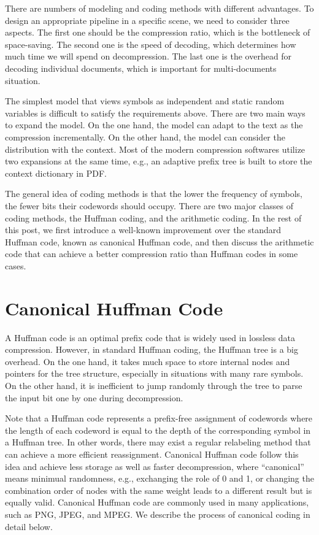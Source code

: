 \documentclass[a4paper,11pt]{article}
\begin{document}
There are numbers of modeling and coding methods with different advantages. To design an appropriate pipeline in a specific scene, we need to consider three aspects. The first one should be the compression ratio, which is the bottleneck of space-saving. The second one is the speed of decoding, which determines how much time we will spend on decompression. The last one is the overhead for decoding individual documents, which is important for multi-documents situation. 

The simplest model that views symbols as independent and static random variables is difficult to satisfy the requirements above. There are two main ways to expand the model. On the one hand, the model can adapt to the text as the compression incrementally. On the other hand, the model can consider the distribution with the context. Most of the modern compression softwares utilize two expansions at the same time, e.g., an adaptive prefix tree is built to store the context dictionary in PDF.

The general idea of coding methods is that the lower the frequency of symbols, the fewer bits their codewords should occupy. There are two major classes of coding methods, the Huffman coding, and the arithmetic coding. In the rest of this post, we first introduce a well-known improvement over the standard Huffman code, known as canonical Huffman code, and then discuss the arithmetic code that can achieve a better compression ratio than Huffman codes in some cases.


\section{Canonical Huffman Code}
A Huffman code is an optimal prefix code that is widely used in lossless data compression. However, in standard Huffman coding, the Huffman tree is a big overhead. On the one hand, it takes much space to store internal nodes and pointers for the tree structure, especially in situations with many rare symbols. On the other hand, it is inefficient to jump randomly through the tree to parse the input bit one by one during decompression. 

Note that a Huffman code represents a prefix-free assignment of codewords where the length of each codeword is equal to the depth of the corresponding symbol in a Huffman tree. In other words, there may exist a regular relabeling method that can achieve a more efficient reassignment. Canonical Huffman code follow this idea and achieve less storage as well as faster decompression, where ``canonical'' means minimual randomness, e.g., exchanging the role of 0 and 1, or changing the combination order of nodes with the same weight leads to a different result but is equally valid. Canonical Huffman code are commonly used in many applications, such as PNG, JPEG, and MPEG. We describe the process of canonical coding in detail below.
\end{document}
